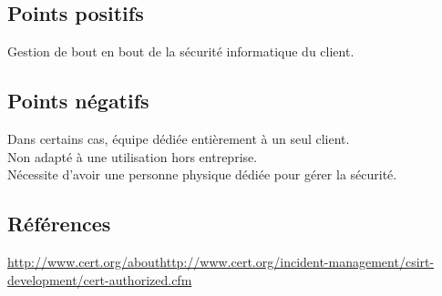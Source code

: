 \subsection{Points positifs}
Gestion de bout en bout de la sécurité informatique du client.

\subsection{Points négatifs}
Dans certains cas, équipe dédiée entièrement à un seul client.\\
Non adapté à une utilisation hors entreprise.\\
Nécessite d’avoir une personne physique dédiée pour gérer la sécurité.\\

\subsection{Références}
\small
\noindent
[1][2] \url{http://www.cert.org/about}\newline
[3][4] \url{http://www.cert.org/incident-management/csirt-development/cert-authorized.cfm}\newline
\normalsize